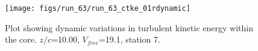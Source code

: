 \begin{figure}[H]
\centering
\texttt{[image: figs/run\_63/run\_63\_ctke\_01rdynamic]}
\caption{Plot showing dynamic variations in turbulent kinetic energy within the core. $z/c$=10.00, $V_{free}$=19.1, station 7.}
\label{fig:run_63_ctke_01rdynamic}
\end{figure}


